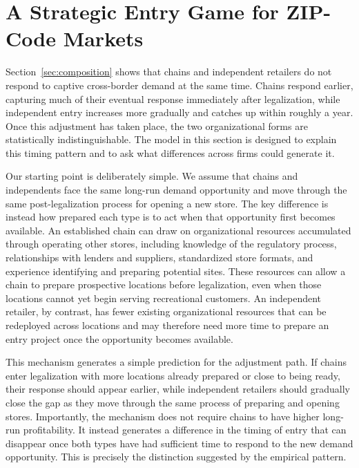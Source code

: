 \documentclass[english,12pt]{article}
\begin{document}
\begin{table}[htbp]

\centering\scriptsize

\caption{Quarter-specific coefficients for independent brands, chain brands, and their difference (independent minus chain), nonlegal- vs.\ always-legal-border ZIP codes. Same sample and controls as Figure~\ref{fig:fact3diff}; standard errors (in parentheses) clustered by county. $^{*}p<.10$ $^{**}p<.05$ $^{***}p<.01$.}
\label{table:fact3dynamic}
\end{table}


\FloatBarrier

\bigskip

\section{A Strategic Entry Game for ZIP-Code Markets}
\label{sec:model}

Section~\ref{sec:composition} shows that chains and independent retailers do not respond to captive cross-border demand at the same time. Chains respond earlier, capturing much of their eventual response immediately after legalization, while independent entry increases more gradually and catches up within roughly a year. Once this adjustment has taken place, the two organizational forms are statistically indistinguishable. The model in this section is designed to explain this timing pattern and to ask what differences across firms could generate it.

Our starting point is deliberately simple. We assume that chains and independents face the same long-run demand opportunity and move through the same post-legalization process for opening a new store. The key difference is instead how prepared each type is to act when that opportunity first becomes available. An established chain can draw on organizational resources accumulated through operating other stores, including knowledge of the regulatory process, relationships with lenders and suppliers, standardized store formats, and experience identifying and preparing potential sites. These resources can allow a chain to prepare prospective locations before legalization, even when those locations cannot yet begin serving recreational customers. An independent retailer, by contrast, has fewer existing organizational resources that can be redeployed across locations and may therefore need more time to prepare an entry project once the opportunity becomes available.

This mechanism generates a simple prediction for the adjustment path. If chains enter legalization with more locations already prepared or close to being ready, their response should appear earlier, while independent retailers should gradually close the gap as they move through the same process of preparing and opening stores. Importantly, the mechanism does not require chains to have higher long-run profitability. It instead generates a difference in the timing of entry that can disappear once both types have had sufficient time to respond to the new demand opportunity. This is precisely the distinction suggested by the empirical pattern.
\end{document}
